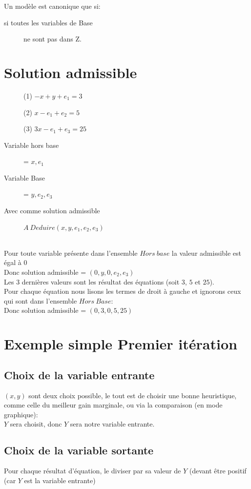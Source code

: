 Un modèle est canonique que si:
\begin{description}
\item[si toutes les variables de Base] ne sont pas dans Z.
\end{description}

\section{Solution admissible}
\begin{description}
\item[] (1) $-x + y + e_1 = 3$
\item[] (2) $x - e_1 + e_2 = 5$
\item[] (3) $3x - e_1 + e_3 = 25$
\item[Variable hors base] = $x,e_1$
\item[Variable Base] = $y,e_2,e_3$
\item[Avec comme solution admissible] $A\ Deduire (x,y,e_1,e_2,e_3)$
\end{description}
\ \\
Pour toute variable présente dans l'ensemble $Hors\ base$ la valeur admissible est égal à $0$\\
Donc solution admissible = $(0, y, 0, e_2, e_3)$\\
Les 3 dernières valeurs sont les résultat des équations (soit $3$, $5$ et $25$).\\
Pour chaque équation nous lisons les termes de droit à gauche et ignorons ceux qui sont dans l'ensemble $Hors\ Base$:\\
Donc solution admissible = $(0, 3, 0, 5, 25)$\\

\section{Exemple simple Premier itération}
\subsection{Choix de la variable entrante}
$(x,y)$ sont deux choix possible, le tout est de choisir une bonne heuristique, comme celle du meilleur gain marginale, ou via la comparaison (en mode graphique):\\
$Y$ sera choisit, donc $Y$ sera notre variable entrante.\\

\subsection{Choix de la variable sortante}
Pour chaque résultat d'équation, le diviser par sa valeur de $Y$ (devant être positif (car $Y$ est la variable entrante)\\

